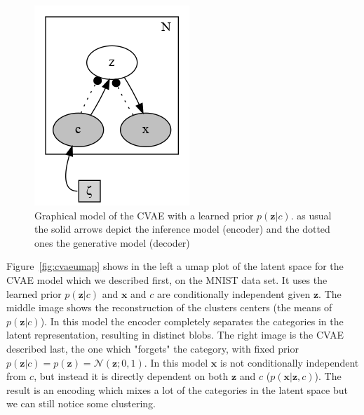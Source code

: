 \documentclass[11pt, a4paper]{report}
\theoremstyle{plain}
\theoremstyle{definition}
\theoremstyle{remark}
\newcommand{\x}{\mathbf{x}}
\newcommand{\z}{\mathbf{z}}
\newcommand{\NN}{\mathcal{N}}
\begin{document}
\begin{figure}[h]
\centering
\includegraphics[width=0.4 \textwidth]{plots/cvae.gv.png}
\caption{Graphical model of the CVAE with a learned prior $p(\z | c)$.
as usual the solid arrows depict the inference model (encoder) and the dotted
ones the generative model (decoder)}
\label{fig:cvae}
\end{figure}

Figure~\ref{fig:cvaeumap} shows in the left a umap plot of the latent space for
the CVAE model which we described first, on the MNIST data set.
It uses the learned prior $p(\z|c)$ and
$\x$ and $c$ are conditionally independent given $\z$.
The middle image shows the reconstruction of the clusters centers (the means of
$p(\z | c)$). In this model the encoder completely separates the categories in
the latent representation, resulting in distinct blobs.
The right image is the CVAE described last, the one which "forgets" the
category, with fixed prior $p(\z | c) = p(\z) = \NN(\z;0,1)$.
In this model $\x$ is not conditionally independent from $c$, but instead it 
is directly dependent on both $\z$ and $c$ ($p(\x | \z, c)$).
The result is an encoding which mixes a lot of the categories in the latent
space but we can still notice some clustering.
\end{document}
